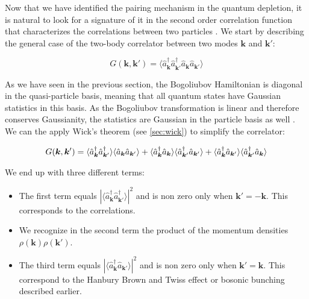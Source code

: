 
\label{sec:2nd_order_bogo}

Now that we have identified the \kmk pairing mechanism in the quantum depletion, it is natural to look for a signature of it in the second order correlation function that characterizes the correlations between two particles \cite{butera2020,mathey2009noise,toth2008theory}. We start by describing the general case of the two-body correlator between two modes $\bm{k}$ and $\bm{k'}$:

\begin{equation}
    G(\bm{k},\bm{k}')=\langle \hat{a}^{\dagger}_{\bm{k}} \hat{a}^{\dagger}_{\bm k'} \hat{a}_{\bm k} \hat{a}_{\bm {k}'} \rangle
\end{equation}

As we have seen in the previous section, the Bogoliubov Hamiltonian is diagonal in the quasi-particle basis, meaning that all quantum states have Gaussian statistics in this basis. As the Bogoliubov transformation is linear and therefore conserves Gaussianity, the statistics are Gaussian in the particle basis as well \cite{butera2020}. We can the apply Wick's theorem (see \ref{sec:wick}) to simplify the correlator:

\begin{equation}
    G(\bm{k},\bm{k}')=\langle \hat{a}^{\dagger}_{\bm k} \hat{a}^{\dagger}_{\bm {k}'} \rangle \langle\hat{a}_{\bm k} \hat{a}_{\bm {k}'}\rangle + \langle \hat{a}^{\dagger}_{\bm k} \hat{a}_{\bm k} \rangle \langle \hat{a}^{\dagger}_{\bm {k}'} \hat{a}_{\bm {k}'} \rangle + \langle \hat{a}^{\dagger}_{\bm k} \hat{a}_{\bm {k}'} \rangle \langle \hat{a}^{\dagger}_{\bm {k}'} \hat{a}_{\bm k} \rangle
    \label{eq:wick_bogo}
\end{equation}

We end up with three different terms:

\begin{itemize}
    \item The first term equals $| \langle \hat{a}^{\dagger}_{\bm k} \hat{a}^{\dagger}_{\bm {k}'} \rangle |^2$ and is non zero only when $\bm{k}'=-\bm{k}$. This corresponds to the \kmk correlations.
    \item We recognize in the second term the product of the momentum densities $\rho(\bm{k}) \rho(\bm{k}')$.
    \item The third term equals $| \langle \hat{a}^{\dagger}_{\bm k} \hat{a}_{\bm {k}'} \rangle |^2$ and is non zero only when $\bm{k}'=\bm{k}$. This correspond to the Hanbury Brown and Twiss effect or bosonic bunching described earlier.
\end{itemize}


